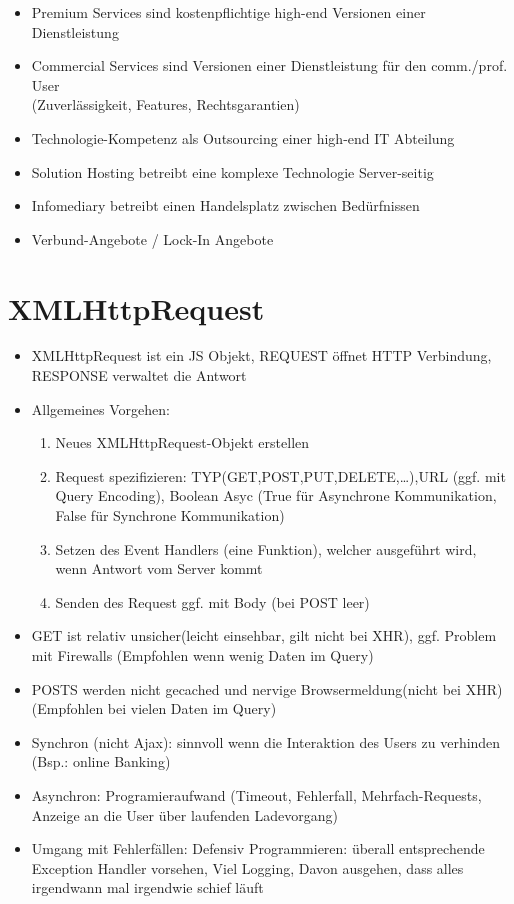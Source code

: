 \documentclass{article} %
\begin{document}
			\begin{itemize}
				\item Premium Services sind kostenpflichtige high-end Versionen einer Dienstleistung
				\item Commercial Services sind Versionen einer Dienstleistung für den comm./prof. User\\
				(Zuverlässigkeit, Features, Rechtsgarantien)
				\item Technologie-Kompetenz als Outsourcing einer high-end IT Abteilung
				\item Solution Hosting betreibt eine komplexe Technologie Server-seitig
				\item Infomediary betreibt einen Handelsplatz zwischen Bedürfnissen
				\item Verbund-Angebote / Lock-In Angebote
			\end{itemize}
			
						
	\section{XMLHttpRequest}
	\begin{itemize}
		\item XMLHttpRequest ist ein JS Objekt, REQUEST öffnet HTTP Verbindung, RESPONSE verwaltet die Antwort
		\item Allgemeines Vorgehen:
		\begin{enumerate}
			\item Neues XMLHttpRequest-Objekt erstellen
			\item Request spezifizieren: TYP(GET,POST,PUT,DELETE,\dots),URL (ggf. mit Query Encoding), Boolean Asyc (True für Asynchrone Kommunikation, False für Synchrone Kommunikation)
			\item Setzen des Event Handlers (eine Funktion), welcher ausgeführt wird, wenn Antwort vom Server kommt
			\item Senden des Request ggf. mit Body (bei POST leer)
		\end{enumerate}
		\item GET ist relativ unsicher(leicht einsehbar, gilt nicht bei XHR), ggf. Problem mit Firewalls (Empfohlen wenn wenig Daten im Query)
		\item POSTS werden nicht gecached und nervige Browsermeldung(nicht bei XHR) (Empfohlen bei vielen Daten im Query)
		\item Synchron (nicht Ajax): sinnvoll wenn die Interaktion des Users zu verhinden (Bsp.: online Banking)
		\item Asynchron: Programieraufwand (Timeout, Fehlerfall, Mehrfach-Requests, Anzeige an die User über laufenden Ladevorgang)
		\item Umgang mit Fehlerfällen: Defensiv Programmieren: überall entsprechende Exception Handler vorsehen, Viel Logging, Davon ausgehen, dass alles irgendwann mal irgendwie schief läuft
	\end{itemize}
			
\end{document}
